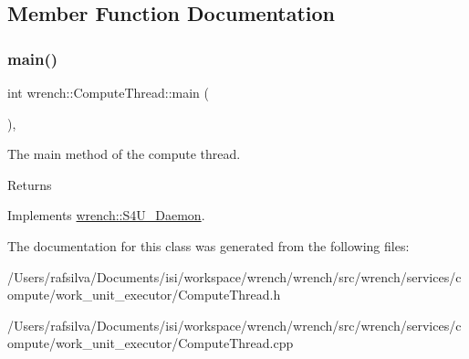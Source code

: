 \subsection{Member Function Documentation}
\mbox{\label{classwrench_1_1_compute_thread_aae43a83a656caf607342b248ee5cde2a}} 
\subsubsection{\texorpdfstring{main()}{main()}}
{\footnotesize\ttfamily int wrench\+::\+Compute\+Thread\+::main (\begin{DoxyParamCaption}{ }\end{DoxyParamCaption})\hspace{0.3cm}{\ttfamily [override]}, {\ttfamily [virtual]}}



The main method of the compute thread. 

\begin{DoxyReturn}{Returns}

\end{DoxyReturn}


Implements \hyperlink{classwrench_1_1_s4_u___daemon_a0073b1104849679756809330533400eb}{wrench\+::\+S4\+U\+\_\+\+Daemon}.



The documentation for this class was generated from the following files\+:\begin{DoxyCompactItemize}
\item 
/\+Users/rafsilva/\+Documents/isi/workspace/wrench/wrench/src/wrench/services/compute/work\+\_\+unit\+\_\+executor/Compute\+Thread.\+h\item 
/\+Users/rafsilva/\+Documents/isi/workspace/wrench/wrench/src/wrench/services/compute/work\+\_\+unit\+\_\+executor/Compute\+Thread.\+cpp\end{DoxyCompactItemize}
